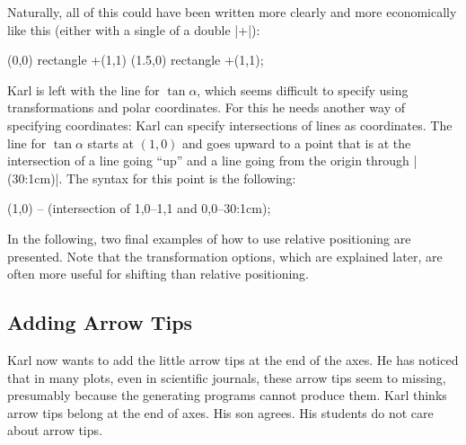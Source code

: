 Naturally, all of this could have been written more clearly and more
economically like this (either with a single of a double |+|): 
\begin{codeexample}[]
\tikz \draw (0,0) rectangle +(1,1)  (1.5,0) rectangle +(1,1);
\end{codeexample}



Karl is left with the line for $\tan \alpha$, which seems difficult to
specify using transformations and polar coordinates. For this he needs
another way of specifying coordinates: Karl can specify intersections
of lines as coordinates. The line for $\tan \alpha$ starts at $(1,0)$
and goes upward to a point that is at the intersection of a line going
``up'' and a line going from the origin through |(30:1cm)|. The syntax
for this point is the following:

\begin{codeexample}
 (1,0) -- (intersection of 1,0--1,1 and 0,0--30:1cm);
\end{codeexample}

In the following, two final examples of how to use relative
positioning are presented. Note that the transformation options,
which are explained later, are often more useful for shifting than
relative positioning. 

\begin{codeexample}[]
\end{codeexample}



\subsection{Adding Arrow Tips}

Karl now wants to add the little arrow tips at the end of the axes. He has
noticed that in many plots, even in scientific journals, these arrow tips
seem to missing, presumably because the generating programs cannot
produce them. Karl thinks arrow tips belong at the end of axes. His
son agrees. His students do not care about arrow tips.

